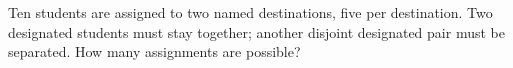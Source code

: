Ten students are assigned to two named destinations, five per destination. Two designated students must stay together; another disjoint designated pair must be separated. How many assignments are possible?
